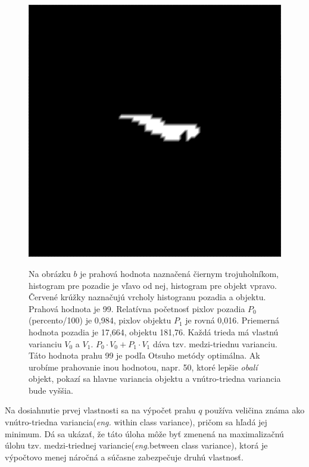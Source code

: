 \documentclass[a4paper,11pt,oneside]{article}%
\begin{document}
\begin{figure}[h!]
\begin{center}
    {\includegraphics[scale=0.155]{pics/cropT8_otsu.png}}
\caption{Na obrázku $b$ je prahová hodnota naznačená čiernym trojuholníkom, histogram pre pozadie je vľavo od nej, histogram pre objekt vpravo. Červené krúžky naznačujú vrcholy histogranu pozadia a objektu. Prahová hodnota je 99. Relatívna početnosť pixlov pozadia $P_0$ (percento/100) je 0,984, pixlov objektu $P_1$  je rovná 0,016. Priemerná hodnota pozadia je 17,664, objektu 181,76. Každá trieda má vlastnú varianciu $V_0$ a $V_1$. $P_0\cdot V_0+ P_1\cdot V_1$ dáva tzv. medzi-triednu varianciu. Táto hodnota prahu 99 je podľa Otsuho metódy optimálna. Ak urobíme prahovanie inou hodnotou, napr. 50, ktoré lepšie \textit{obalí} objekt, pokazí sa hlavne variancia objektu a vnútro-triedna variancia bude vyššia. }
\label{fig:otsuteoria}
\end{center}   
\end{figure}

 Na dosiahnutie prvej vlastnosti sa na výpočet prahu $q$ používa veličina známa ako vnútro-triedna variancia(\textit{eng.} within class variance), pričom sa hľadá jej minimum. Dá sa ukázať, že táto úloha môže byť zmenená na maximalizačnú úlohu tzv. medzi-triednej variancie(\textit{eng.}between class variance), ktorá je výpočtovo menej náročná a súčasne zabezpečuje druhú vlastnosť.  
\end{document}
